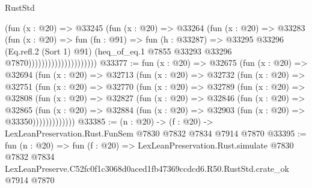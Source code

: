 \begin{lexlean}{RustStd}
\begin{coremodule}
                                    (fun (x : @20) =>
                                    @33245
                                      (fun (x : @20) =>
                                      @33264
                                        (fun (x : @20) =>
                                        @33283
                                          (fun (x : @20) =>
                                          fun (fn : @91) =>
                                          fun (h : @33287) =>
                                          @33295
                                            @33296
                                            (Eq.refl.{2} (Sort 1) @91)
                                            (heq_of_eq.{1}
                                              @7855
                                              @33293
                                              @33296
                                              @7870)))))))))))))))))))))
@33377 := fun (x : @20) =>
  @32675
    (fun (x : @20) =>
    @32694
      (fun (x : @20) =>
      @32713
        (fun (x : @20) =>
        @32732
          (fun (x : @20) =>
          @32751
            (fun (x : @20) =>
            @32770
              (fun (x : @20) =>
              @32789
                (fun (x : @20) =>
                @32808
                  (fun (x : @20) =>
                  @32827
                    (fun (x : @20) =>
                    @32846
                      (fun (x : @20) =>
                      @32865
                        (fun (x : @20) =>
                        @32884 (fun (x : @20) => @32903 (fun (x : @20) => @33350)))))))))))))
@33385 := (n : @20) -> (f : @20) -> LexLeanPreservation.Rust.FunSem @7830 @7832 @7834 @7914 @7870
@33395 := fun (n : @20) =>
  fun (f : @20) =>
  LexLeanPreservation.Rust.simulate
    @7830
    @7832
    @7834
    LexLeanPreserve.C52fc0f1c3068d0aced1fb47369ccdcd6.R50.RustStd.crate_ok
    @7914
    @7870
\end{coremodule}
\end{lexlean}
